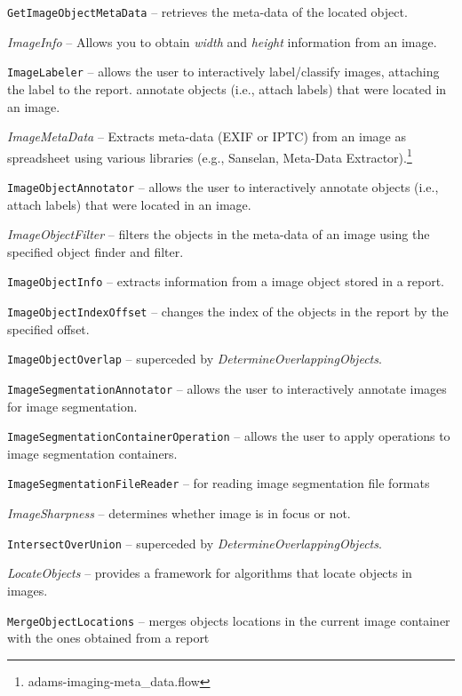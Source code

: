 \documentclass[a4paper]{book}
\begin{document}
\begin{tight_itemize}
  \item \texttt{GetImageObjectMetaData} -- retrieves the meta-data of
  the located object.
  \item \textit{ImageInfo} -- Allows you to obtain \textit{width} and
  \textit{height} information from an image.
  \item \texttt{ImageLabeler} -- allows the user to interactively label/classify
  images, attaching the label to the report.
   annotate objects (i.e., attach labels) that were located in an image.
  \item \textit{ImageMetaData} -- Extracts meta-data (EXIF or IPTC) from an
  image as spreadsheet using various libraries (e.g., Sanselan\cite{sanselan},
  Meta-Data Extractor\cite{metadataextractor}).\footnote{adams-imaging-meta\_data.flow}
  \item \texttt{ImageObjectAnnotator} -- allows the user to interactively
   annotate objects (i.e., attach labels) that were located in an image.
  \item \textit{ImageObjectFilter} -- filters the objects in the meta-data of an image
  using the specified object finder and filter.
  \item \texttt{ImageObjectInfo} -- extracts information from a image object
  stored in a report.
  \item \texttt{ImageObjectIndexOffset} -- changes the index of the objects in the
  report by the specified offset.
  \item \texttt{ImageObjectOverlap} -- superceded by \textit{DetermineOverlappingObjects}.
  \item \texttt{ImageSegmentationAnnotator} -- allows the user to interactively
  annotate images for image segmentation.
  \item \texttt{ImageSegmentationContainerOperation} -- allows the user to apply
  operations to image segmentation containers.
  \item \texttt{ImageSegmentationFileReader} -- for reading image segmentation file formats
  \item \textit{ImageSharpness} -- determines whether image is in focus or not.
  \item \texttt{IntersectOverUnion} -- superceded by \textit{DetermineOverlappingObjects}.
  \item \textit{LocateObjects} -- provides a framework for algorithms that
  locate objects in images.
  \item \texttt{MergeObjectLocations} -- merges objects locations
  in the current image container with the ones obtained from a report

\end{tight_itemize}
\end{document}
